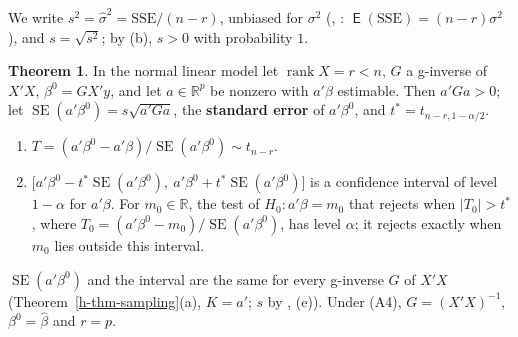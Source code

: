 \documentclass[12pt]{article}
\newcommand{\R}{\mathbb R}
\DeclareMathOperator{\rank}{rank}
\DeclareMathOperator\expc{\mathsf{E}}
\theoremstyle{definition}
\newtheorem{theorem}{Theorem}
\DeclareMathOperator{\SE}{SE}
\begin{document}
We write \(s^2=\hat\sigma^2=\mathrm{SSE}/(n-r)\), unbiased for \(\sigma^2\) (, :
\(\expc(\mathrm{SSE})=(n-r)\sigma^2\)), and \(s=\sqrt{s^2}\); by (b), \(s>0\) with probability \(1\).

\begin{theorem}\label{h-thm-t}
In the normal linear model let \(\rank X=r<n\), \(G\) a g-inverse of \(X'X\), \(\beta^0=GX'y\), and let \(a\in\R^p\) be
nonzero with \(a'\beta\) estimable. Then \(a'Ga>0\); let \(\SE(a'\beta^0)=s\sqrt{a'Ga}\), the \textbf{standard error} of
\(a'\beta^0\), and \(t^*=t_{n-r,1-\alpha/2}\).
\begin{enumerate}
\item \(T=(a'\beta^0-a'\beta)/\SE(a'\beta^0)\sim t_{n-r}\).
\item \(\bigl[a'\beta^0-t^*\SE(a'\beta^0),\ a'\beta^0+t^*\SE(a'\beta^0)\bigr]\) is a confidence interval of level
\(1-\alpha\) for \(a'\beta\). For \(m_0\in\R\), the test of \(H_0\colon a'\beta=m_0\) that rejects when
\(\lvert T_0\rvert>t^*\), where \(T_0=(a'\beta^0-m_0)/\SE(a'\beta^0)\), has level \(\alpha\); it rejects exactly when
\(m_0\) lies outside this interval.
\end{enumerate}
\(\SE(a'\beta^0)\) and the interval are the same for every g-inverse \(G\) of \(X'X\) (Theorem~\ref{h-thm-sampling}(a),
\(K=a'\); \(s\) by , (e)). Under (A4), \(G=(X'X)^{-1}\), \(\beta^0=\hat\beta\) and \(r=p\).
\end{theorem}
\end{document}
